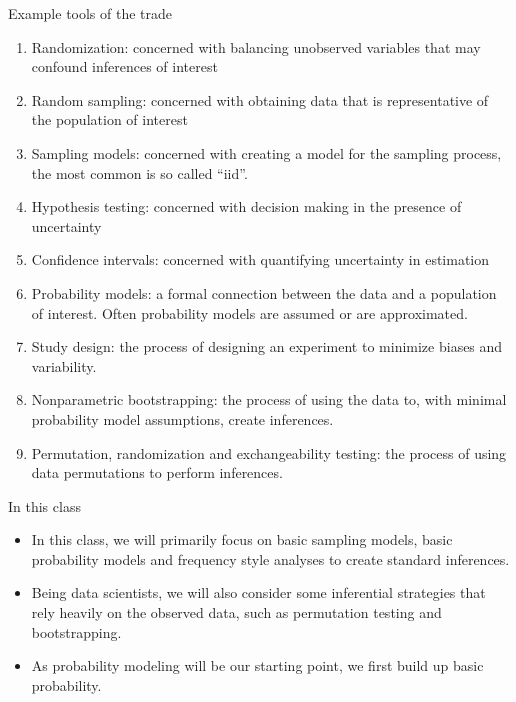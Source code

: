 \documentclass[
  ignorenonframetext,
]{beamer}
\providecommand{\tightlist}{%
  \setlength{\itemsep}{0pt}\setlength{\parskip}{0pt}}
\begin{document}
\begin{frame}{Example tools of the trade}
\protect\hypertarget{example-tools-of-the-trade}{}

\begin{enumerate}
\tightlist
\item
  Randomization: concerned with balancing unobserved variables that may
  confound inferences of interest
\item
  Random sampling: concerned with obtaining data that is representative
  of the population of interest
\item
  Sampling models: concerned with creating a model for the sampling
  process, the most common is so called ``iid''.
\item
  Hypothesis testing: concerned with decision making in the presence of
  uncertainty
\item
  Confidence intervals: concerned with quantifying uncertainty in
  estimation
\item
  Probability models: a formal connection between the data and a
  population of interest. Often probability models are assumed or are
  approximated.
\item
  Study design: the process of designing an experiment to minimize
  biases and variability.
\item
  Nonparametric bootstrapping: the process of using the data to, with
  minimal probability model assumptions, create inferences.
\item
  Permutation, randomization and exchangeability testing: the process of
  using data permutations to perform inferences.
\end{enumerate}

\end{frame}

\begin{frame}{In this class}
\protect\hypertarget{in-this-class}{}

\begin{itemize}
\tightlist
\item
  In this class, we will primarily focus on basic sampling models, basic
  probability models and frequency style analyses to create standard
  inferences.
\item
  Being data scientists, we will also consider some inferential
  strategies that rely heavily on the observed data, such as permutation
  testing and bootstrapping.
\item
  As probability modeling will be our starting point, we first build up
  basic probability.
\end{itemize}

\end{frame}
\end{document}
